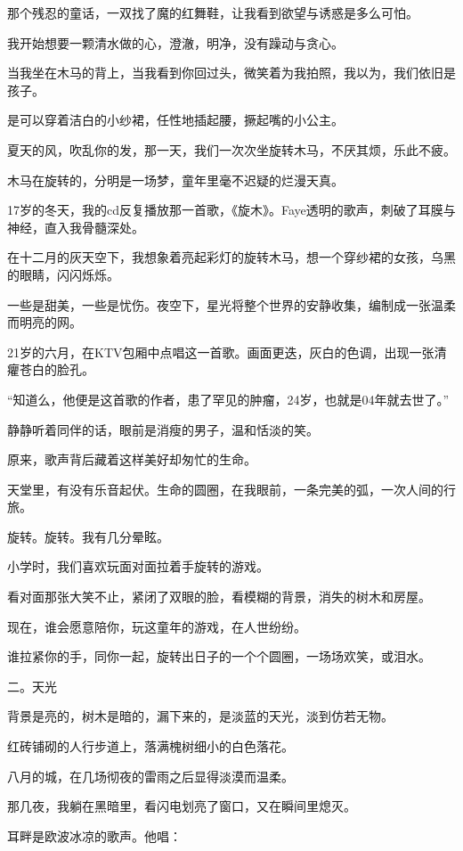\documentclass[12pt,a4paper]{article}
\def\blankrev{\vspace{1ex}}									%
\newcommand{\subpart}[1]{
	\begingroup \par
	\vspace{1ex} \centering #1
	\par \endgroup \nopagebreak[4]
}
\begin{document}
		\blankrev
		那个残忍的童话，一双找了魔的红舞鞋，让我看到欲望与诱惑是多么可怕。\par
		我开始想要一颗清水做的心，澄澈，明净，没有躁动与贪心。\par
		当我坐在木马的背上，当我看到你回过头，微笑着为我拍照，我以为，我们依旧是孩子。\par
		是可以穿着洁白的小纱裙，任性地插起腰，撅起嘴的小公主。\par
		夏天的风，吹乱你的发，那一天，我们一次次坐旋转木马，不厌其烦，乐此不疲。\par
		木马在旋转的，分明是一场梦，童年里毫不迟疑的烂漫天真。\par
		17岁的冬天，我的cd反复播放那一首歌，《旋木》。Faye透明的歌声，刺破了耳膜与神经，直入我骨髓深处。\par
		在十二月的灰天空下，我想象着亮起彩灯的旋转木马，想一个穿纱裙的女孩，乌黑的眼睛，闪闪烁烁。\par
		一些是甜美，一些是忧伤。夜空下，星光将整个世界的安静收集，编制成一张温柔而明亮的网。\par
		21岁的六月，在KTV包厢中点唱这一首歌。画面更迭，灰白的色调，出现一张清癯苍白的脸孔。\par
		“知道么，他便是这首歌的作者，患了罕见的肿瘤，24岁，也就是04年就去世了。”\par
		静静听着同伴的话，眼前是消瘦的男子，温和恬淡的笑。\par
		原来，歌声背后藏着这样美好却匆忙的生命。\par
		天堂里，有没有乐音起伏。生命的圆圈，在我眼前，一条完美的弧，一次人间的行旅。\par
		旋转。旋转。我有几分晕眩。\par
		小学时，我们喜欢玩面对面拉着手旋转的游戏。\par
		看对面那张大笑不止，紧闭了双眼的脸，看模糊的背景，消失的树木和房屋。\par
		现在，谁会愿意陪你，玩这童年的游戏，在人世纷纷。\par
		谁拉紧你的手，同你一起，旋转出日子的一个个圆圈，一场场欢笑，或泪水。


		\subpart{二。天光}

		背景是亮的，树木是暗的，漏下来的，是淡蓝的天光，淡到仿若无物。\par
		红砖铺砌的人行步道上，落满槐树细小的白色落花。\par
		八月的城，在几场彻夜的雷雨之后显得淡漠而温柔。\par
		那几夜，我躺在黑暗里，看闪电划亮了窗口，又在瞬间里熄灭。\par
		耳畔是欧波冰凉的歌声。他唱：
\end{document}
